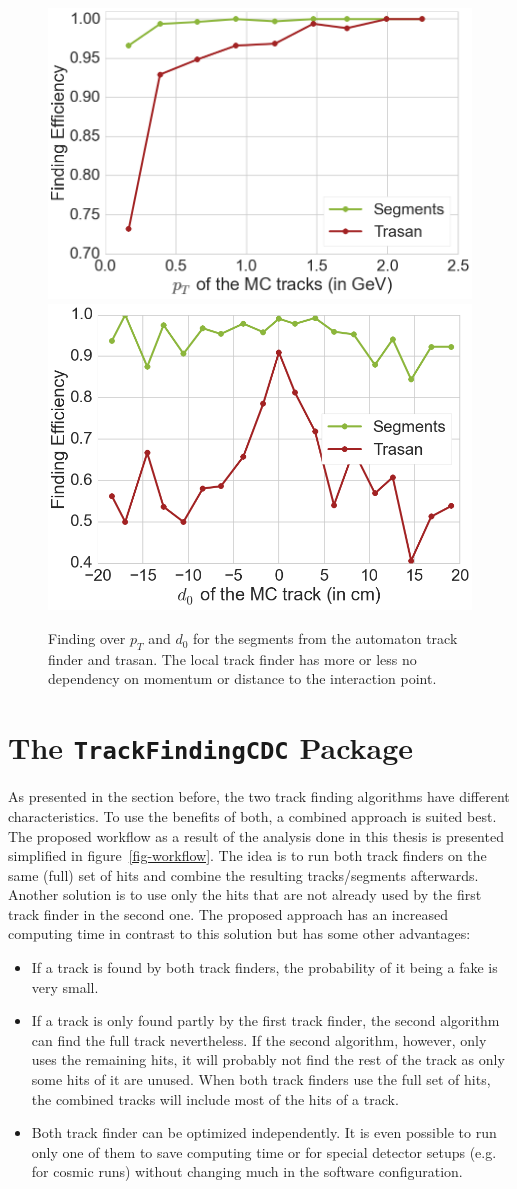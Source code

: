 \begin{figure}
  \centering
  \includegraphics[width=0.48\linewidth]{figures/workflow/segments_pt.png}
  \includegraphics[width=0.48\linewidth]{figures/workflow/segments_d0.png}
  \caption{Finding over $p_T$ and $d_0$ for the segments from the automaton track finder and trasan. The local track finder has more or less no dependency on momentum or distance to the interaction point.}
  \label{fig-segments-efficiency}
\end{figure}

\section{The \texttt{TrackFindingCDC} Package}
As presented in the section before, the two track finding algorithms have different characteristics. To use the benefits of both, a combined approach is suited best. The proposed workflow as a result of the analysis done in this thesis is presented simplified in figure~\ref{fig-workflow}. The idea is to run both track finders on the same (full) set of hits and combine the resulting tracks/segments afterwards. Another solution is to use only the hits that are not already used by the first track finder in the second one. The proposed approach has an increased computing time in contrast to this solution but has some other advantages: 
\begin{itemize}
 \item If a track is found by both track finders, the probability of it being a fake is very small.
 \item If a track is only found partly by the first track finder, the second algorithm can find the full track nevertheless. If the second algorithm, however, only uses the remaining hits, it will probably not find the rest of the track as only some hits of it are unused. When both track finders use the full set of hits, the combined tracks will include most of the hits of a track.
 \item Both track finder can be optimized independently. It is even possible to run only one of them to save computing time or for special detector setups (e.g. for cosmic runs) without changing much in the software configuration.
\end{itemize}

